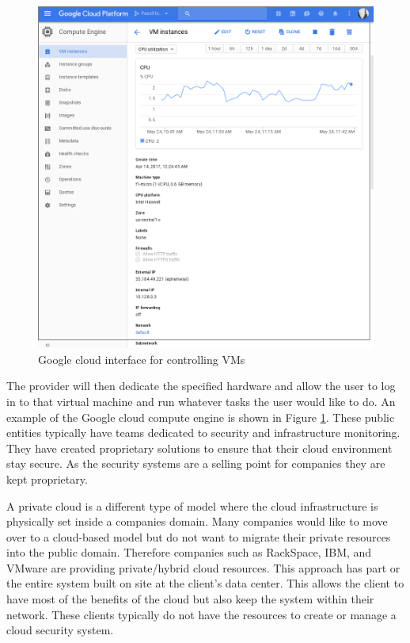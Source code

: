 \documentclass[12pt]{article}
\begin{document}
\begin{figure}[ht]
    \centering
    \includegraphics[scale=.3]{./pic/2017-05-24-114324_946x962_scrot.png}
    \caption{Google cloud interface for controlling VMs}
    \label{fig:GoogleInterface}
\end{figure}

The provider will then dedicate the specified hardware and allow the user to log in to that virtual machine and run whatever tasks the user would like to do. An example of the Google cloud compute engine is shown in Figure \ref{fig:GoogleInterface}.  These public entities typically have teams dedicated to security and infrastructure monitoring. They have created proprietary solutions to ensure that their cloud environment \cite{SecAmazon} stay secure. As the security systems are a selling point for companies they are kept proprietary.

A private cloud is a different type of model where the cloud infrastructure is physically set inside a companies domain. Many companies would like to move over to a cloud-based model but do not want to migrate their private resources into the public domain. Therefore companies such as RackSpace, IBM, and VMware are providing private/hybrid cloud resources. This approach has part or the entire system built on site at the client's data center. This allows the client to have most of the benefits of the cloud but also keep the system within their network. These clients typically do not have the resources to create or manage a cloud security system.
\end{document}
